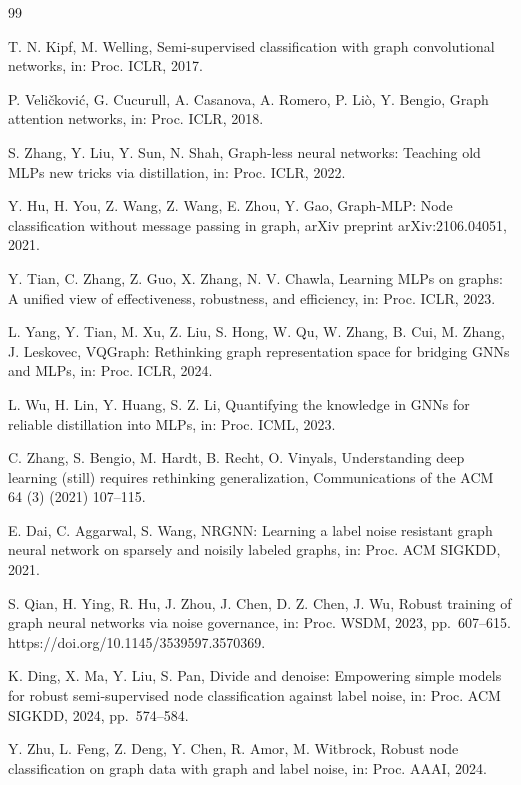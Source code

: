 \begin{thebibliography}{99}
\raggedright

T. N. Kipf, M. Welling, Semi-supervised classification with graph convolutional networks, in: Proc. ICLR, 2017.

P. Veli\v{c}kovi\'{c}, G. Cucurull, A. Casanova, A. Romero, P. Li\`{o}, Y. Bengio, Graph attention networks, in: Proc. ICLR, 2018.

S. Zhang, Y. Liu, Y. Sun, N. Shah, Graph-less neural networks: Teaching old MLPs new tricks via distillation, in: Proc. ICLR, 2022.

Y. Hu, H. You, Z. Wang, Z. Wang, E. Zhou, Y. Gao, Graph-MLP: Node classification without message passing in graph, arXiv preprint arXiv:2106.04051, 2021.

Y. Tian, C. Zhang, Z. Guo, X. Zhang, N. V. Chawla, Learning MLPs on graphs: A unified view of effectiveness, robustness, and efficiency, in: Proc. ICLR, 2023.

L. Yang, Y. Tian, M. Xu, Z. Liu, S. Hong, W. Qu, W. Zhang, B. Cui, M. Zhang, J. Leskovec, VQGraph: Rethinking graph representation space for bridging GNNs and MLPs, in: Proc. ICLR, 2024.

L. Wu, H. Lin, Y. Huang, S. Z. Li, Quantifying the knowledge in GNNs for reliable distillation into MLPs, in: Proc. ICML, 2023.

C. Zhang, S. Bengio, M. Hardt, B. Recht, O. Vinyals, Understanding deep learning (still) requires rethinking generalization, Communications of the ACM 64 (3) (2021) 107--115.

E. Dai, C. Aggarwal, S. Wang, NRGNN: Learning a label noise resistant graph neural network on sparsely and noisily labeled graphs, in: Proc. ACM SIGKDD, 2021.

S. Qian, H. Ying, R. Hu, J. Zhou, J. Chen, D. Z. Chen, J. Wu, Robust training of graph neural networks via noise governance, in: Proc. WSDM, 2023, pp.~607--615. https://doi.org/10.1145/3539597.3570369.

K. Ding, X. Ma, Y. Liu, S. Pan, Divide and denoise: Empowering simple models for robust semi-supervised node classification against label noise, in: Proc. ACM SIGKDD, 2024, pp.~574--584.

Y. Zhu, L. Feng, Z. Deng, Y. Chen, R. Amor, M. Witbrock, Robust node classification on graph data with graph and label noise, in: Proc. AAAI, 2024.


\end{thebibliography}
